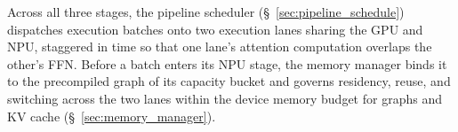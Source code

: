 \documentclass[sigconf,nonacm,10pt]{acmart}
\begin{document}

Across all three stages, the pipeline scheduler (\S~\ref{sec:pipeline_schedule}) dispatches execution batches onto two execution lanes sharing the GPU and NPU, staggered in time so that one lane's attention computation overlaps the other's FFN. Before a batch enters its NPU stage, the memory manager binds it to the precompiled graph of its capacity bucket and governs residency, reuse, and switching across the two lanes within the device memory budget for graphs and KV cache (\S~\ref{sec:memory_manager}).
\end{document}
